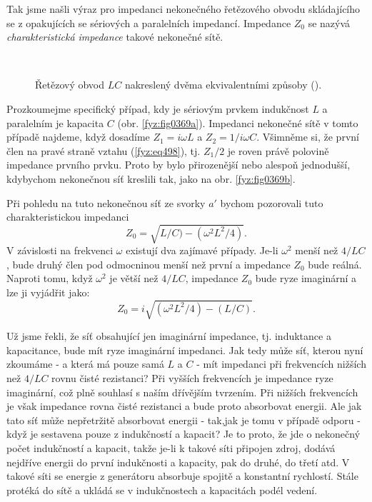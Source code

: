   Tak jsme našli výraz pro impedanci nekonečného řetězového obvodu skládajícího se z opakujících se 
  sériových a paralelních impedancí. Impedance \(Z_0\) se nazývá \emph{charakteristická impedance} 
  takové nekonečné sítě. 
  
  \begin{figure}[ht!] %
    \centering
      \\
    \caption{Řetězový obvod \(LC\) nakreslený dvěma ekvivalentními způsoby
             (\cite[s.~409]{Feynman02}).}
    \label{fyz:fig0369}
  \end{figure}
  Prozkoumejme specifický případ, kdy je sériovým prvkem indukčnost \(L\) a paralelním je kapacita 
  \(C\) (obr. \ref{fyz:fig0369a}). Impedanci nekonečné sítě v tomto případě najdeme, když dosadíme 
  \(Z_1 =i\omega L\) a \(Z_2 = 1/i\omega C\). Všimněme si, že první člen na pravé straně vztahu 
  (\ref{fyz:eq498}), tj. \(Z_1/2\) je roven právě polovině impedance prvního prvku. Proto by bylo 
  přirozenější nebo alespoň jednodušší, kdybychom nekonečnou síť kreslili tak, jako na obr. 
  \ref{fyz:fig0369b}.
  
  Při pohledu na tuto nekonečnou síť ze svorky \(a'\) bychom pozorovali tuto charakteristickou 
  impedanci
  \begin{equation}\label{fyz:eq499}
    Z_0 = \sqrt{L/C) - (\omega^2L^2/4)}.
  \end{equation}
  V závislosti na frekvenci \(\omega\) existují dva zajímavé případy. Je-li \(\omega^2\) menší než 
  \(4/LC\), bude druhý člen pod odmocninou menší než první a impedance \(Z_0\) bude reálná. Naproti 
  tomu, když \(\omega^2\) je větší než \(4/LC\), impedance \(Z_0\) bude ryze imaginární a lze ji 
  vyjádřit jako:
  \begin{equation*}
    Z_0 = i\sqrt{(\omega^2L^2/4) - (L/C)}.
  \end{equation*}
  
  Už jsme řekli, že síť obsahující jen imaginární impedance, tj. induktance a kapacitance, bude mít 
  ryze imaginární impedanci. Jak tedy může síť, kterou nyní zkoumáme - a která má pouze samá \(L\) 
  a \(C\) - mít impedanci při frekvencích nižších než \(4/LC\) rovnu čisté rezistanci? Při vyšších 
  frekvencích je impedance ryze imaginární, což plně souhlasí s naším dřívějším tvrzením. Při 
  nižších frekvencích je však impedance rovna čisté rezistanci a bude proto absorbovat energii. Ale 
  jak tato síť může nepřetržitě absorbovat energii - tak,jak je tomu v případě odporu - když je 
  sestavena pouze z indukčností a kapacit? Je to proto, že jde o nekonečný počet indukčností a 
  kapacit, takže je-li k takové síti připojen zdroj, dodává nejdříve energii do první indukčnosti a 
  kapacity, pak do druhé, do třetí atd. V takové síti se energie z generátoru absorbuje spojitě a 
  konstantní rychlostí. Stále protéká do sítě a ukládá se v indukčnostech a kapacitách podél vedení.
  

